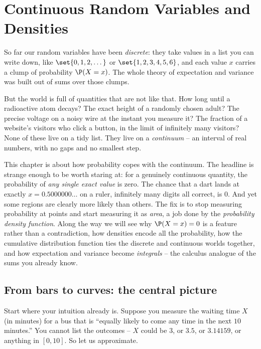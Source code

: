 \chapter{Continuous Random Variables and Densities}

So far our random variables have been \emph{discrete}: they take values in a list
you can write down, like $\set{0,1,2,\dots}$ or $\set{1,2,3,4,5,6}$, and each value
$x$ carries a clump of probability $\P(X=x)$. The whole theory of expectation and
variance was built out of sums over those clumps.

But the world is full of quantities that are not like that. How long until a
radioactive atom decays? The exact height of a randomly chosen adult? The precise
voltage on a noisy wire at the instant you measure it? The fraction of a website's
visitors who click a button, in the limit of infinitely many visitors? None of
these live on a tidy list. They live on a \emph{continuum} -- an interval of real
numbers, with no gaps and no smallest step.

This chapter is about how probability copes with the continuum. The headline is
strange enough to be worth staring at: for a genuinely continuous quantity, the
probability of \emph{any single exact value} is zero. The chance that a dart lands
at exactly $x = 0.5000000\dots$ on a ruler, infinitely many digits all correct, is
$0$. And yet some regions are clearly more likely than others. The fix is to stop
measuring probability at points and start measuring it as \emph{area}, a job done
by the \emph{probability density function}. Along the way we will see why
$\P(X=x)=0$ is a feature rather than a contradiction, how densities encode all the
probability, how the cumulative distribution function ties the discrete and
continuous worlds together, and how expectation and variance become
\emph{integrals} -- the calculus analogue of the sums you already know.

\section{From bars to curves: the central picture}
\label{ch10:bars-to-curves}

Start where your intuition already is. Suppose you measure the waiting time
$X$ (in minutes) for a bus that is ``equally likely to come any time in the next
$10$ minutes.'' You cannot list the outcomes -- $X$ could be $3$, or $3.5$, or
$3.14159$, or anything in $[0,10]$. So let us approximate.

